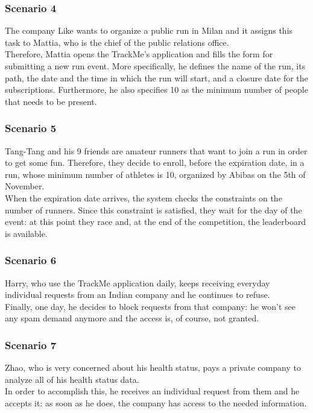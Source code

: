 \subsubsection{Scenario 4}
The company Like wants to organize a public run in Milan and it assigns this task to Mattia, who is the chief of the public relations office. \\
Therefore, Mattia opens the TrackMe's application and fills the form for submitting a new run event. 
More specifically, he defines the name of the run, its path, the date and the time in which the run will start, and a closure date for the subscriptions. 
Furthermore, he also specifies 10 as the minimum number of people that needs to be present.

\subsubsection{Scenario 5}
Tang-Tang and his 9 friends are amateur runners that want to join a run in order to get some fun. 
Therefore, they decide to enroll, before the expiration date, in a run, whose minimum number of athletes is 10, organized by Abibas on the 5th of November. \\
When the expiration date arrives, the system checks the constraints on the number of runners. 
Since this constraint is satisfied, they wait for the day of the event: at this point they race and, at the end of the competition, the leaderboard is available. 

\subsubsection{Scenario 6}
Harry, who use the TrackMe application daily, keeps receiving everyday individual requests from an Indian company and he continues to refuse.\\
Finally, one day, he decides to block requests from that company: he won't see any spam demand anymore and the access is, of course, not granted. 

\subsubsection{Scenario 7}
Zhao, who is very concerned about his health status, pays a private company to analyze all of his health status data. \\ 
In order to accomplish this, he receives an individual request from them and he accepts it: as soon as he does, the company has access to the needed information.

